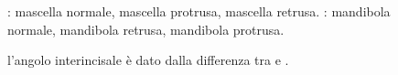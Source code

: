 \begin{figure}[!p]
 \quad
{}
 \centering
 \caption{ : mascella normale, mascella protrusa, mascella retrusa.  : mandibola normale, mandibola retrusa, mandibola protrusa.}
 \label{fig:steiner_sna_snb}
\end{figure}
\begin{figure}[!p]
 \centering
 \caption{l'angolo interincisale  è dato dalla differenza tra  e .}
 \label{fig:steiner_anb}
\end{figure}

